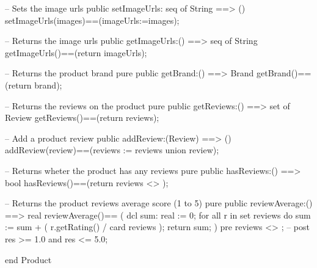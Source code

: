 \begin{vdmpp}[breaklines=true]
  -- Sets the image urls
  public setImageUrls: seq of String ==> ()
  setImageUrls(images)==(imageUrls:=images);
  
  -- Returns the image urls
  public getImageUrls:() ==> seq of String
  getImageUrls()==(return imageUrls);
  
  -- Returns the product brand
  pure public getBrand:() ==> Brand
  getBrand()==(return brand);
  
  -- Returns the reviews on the product
  pure public getReviews:() ==> set of Review
  getReviews()==(return reviews);
  
  -- Add a product review
  public addReview:(Review) ==> ()
  addReview(review)==(reviews := reviews union {review});
  
  -- Returns wheter the product has any reviews
  pure public hasReviews:() ==> bool
  hasReviews()==(return reviews <> {});
  
  -- Returns the product reviews average score (1 to 5)
  pure public reviewAverage:() ==> real
  reviewAverage()==
  (
   dcl sum: real := 0;
   for all r in set reviews do
    sum := sum + ( r.getRating() / card reviews );
   return sum;
  ) pre reviews <> {};
--   post res >= 1.0 and res <= 5.0;
  
end Product
\end{vdmpp}
